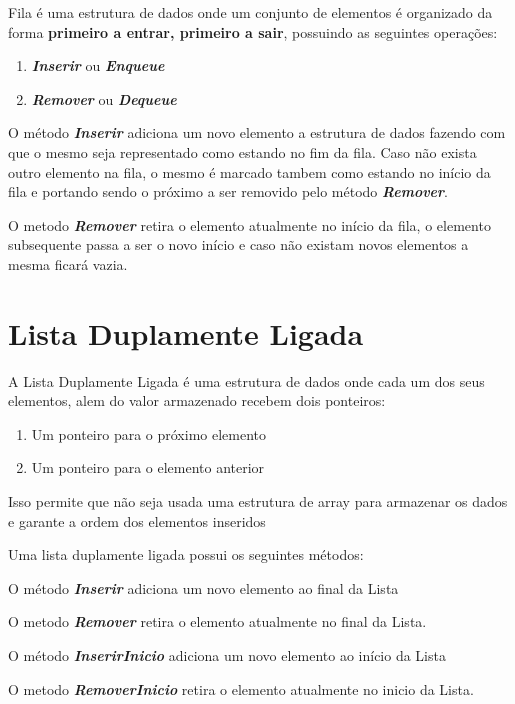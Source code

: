 \documentclass[rascunho,xindy,sublist]{fei}
\begin{document}
Fila é uma estrutura de dados onde um conjunto de elementos é organizado da forma \textbf{primeiro a entrar, primeiro a sair}, possuindo as seguintes operações:

\begin{enumerate}
  \item \textbf{\textit{Inserir}} ou \textbf{\textit{Enqueue}}
  \item \textbf{\textit{Remover}} ou \textbf{\textit{Dequeue}}
\end{enumerate}

O método \textbf{\textit{Inserir}} adiciona um novo elemento a estrutura de dados fazendo com que o mesmo seja representado como estando no fim da fila. Caso não exista outro elemento na fila, o mesmo é marcado tambem como estando no início da fila e portando sendo o próximo a ser removido pelo método  \textbf{\textit{Remover}}. 

O metodo \textbf{\textit{Remover}} retira o elemento atualmente no início da fila, o elemento subsequente passa a ser o novo início e caso não existam novos elementos a mesma ficará vazia.

\section{Lista Duplamente Ligada}

A Lista Duplamente Ligada é uma estrutura de dados onde cada um dos seus elementos, alem do valor armazenado recebem dois ponteiros:

\begin{enumerate}
  \item Um ponteiro para o próximo elemento
  \item Um ponteiro para o elemento anterior
\end{enumerate}

Isso permite que não seja usada uma estrutura de array para armazenar os dados e garante a ordem dos elementos inseridos

Uma lista duplamente ligada possui os seguintes métodos:

O método \textbf{\textit{Inserir}} adiciona um novo elemento ao final da Lista

O metodo \textbf{\textit{Remover}} retira o elemento atualmente no final da Lista.

O método \textbf{\textit{InserirInicio}} adiciona um novo elemento ao início da Lista

O metodo \textbf{\textit{RemoverInicio}} retira o elemento atualmente no inicio da Lista.
\end{document}
